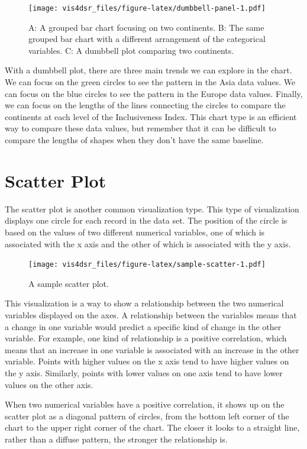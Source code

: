 \documentclass[
]{krantz}
\begin{document}
\begin{figure}
\centering
\texttt{[image: vis4dsr\_files/figure-latex/dumbbell-panel-1.pdf]}
\caption{\label{fig:dumbbell-panel}A: A grouped bar chart focusing on two continents. B: The same grouped bar chart with a different arrangement of the categorical variables. C: A dumbbell plot comparing two continents.}
\end{figure}

With a dumbbell plot, there are three main trends we can explore in the chart. We
can focus on the green circles to see the pattern in the Asia data values. We can
focus on the blue circles to see the pattern in the Europe data values. Finally,
we can focus on the lengths of the lines connecting the circles to compare the
continents at each level of the Inclusiveness Index. This chart type is an efficient
way to compare these data values, but remember that it can be difficult to compare
the lengths of shapes when they don't have the same baseline.

\hypertarget{scatter-plot}{%
\section{Scatter Plot}\label{scatter-plot}}

The scatter plot is another common visualization type. This type of visualization
displays one circle for each record in the data set. The position of the circle is
based on the values of two different numerical variables, one of which is associated
with the x axis and the other of which is associated with the y axis.

\begin{figure}
\centering
\texttt{[image: vis4dsr\_files/figure-latex/sample-scatter-1.pdf]}
\caption{\label{fig:sample-scatter}A sample scatter plot.}
\end{figure}

This visualization is a way to show a relationship between the two numerical variables
displayed on the axes. A relationship between the variables means that a change in one
variable would predict a specific kind of change in the other variable. For example,
one kind of relationship is a positive correlation, which means that an increase in
one variable is associated with an increase in the other variable. Points with higher
values on the x axis tend to have higher values on the y axis. Similarly, points
with lower values on one axis tend to have lower values on the other axis.

When two numerical variables have a positive correlation, it shows up on the scatter
plot as a diagonal pattern of circles, from the bottom left corner of the chart to
the upper right corner of the chart. The closer it looks to a straight line, rather
than a diffuse pattern, the stronger the relationship is.
\end{document}
